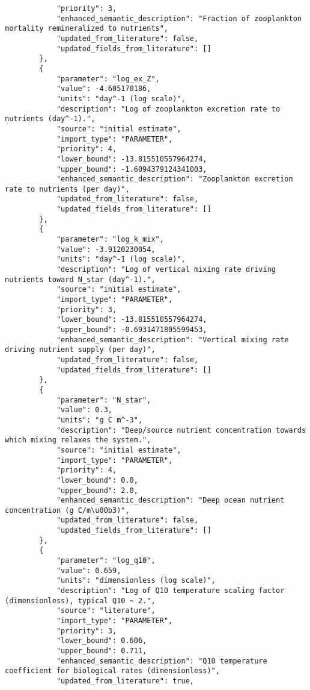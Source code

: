 \begin{lstlisting}
            "priority": 3,
            "enhanced_semantic_description": "Fraction of zooplankton mortality remineralized to nutrients",
            "updated_from_literature": false,
            "updated_fields_from_literature": []
        },
        {
            "parameter": "log_ex_Z",
            "value": -4.605170186,
            "units": "day^-1 (log scale)",
            "description": "Log of zooplankton excretion rate to nutrients (day^-1).",
            "source": "initial estimate",
            "import_type": "PARAMETER",
            "priority": 4,
            "lower_bound": -13.815510557964274,
            "upper_bound": -1.6094379124341003,
            "enhanced_semantic_description": "Zooplankton excretion rate to nutrients (per day)",
            "updated_from_literature": false,
            "updated_fields_from_literature": []
        },
        {
            "parameter": "log_k_mix",
            "value": -3.9120230054,
            "units": "day^-1 (log scale)",
            "description": "Log of vertical mixing rate driving nutrients toward N_star (day^-1).",
            "source": "initial estimate",
            "import_type": "PARAMETER",
            "priority": 3,
            "lower_bound": -13.815510557964274,
            "upper_bound": -0.6931471805599453,
            "enhanced_semantic_description": "Vertical mixing rate driving nutrient supply (per day)",
            "updated_from_literature": false,
            "updated_fields_from_literature": []
        },
        {
            "parameter": "N_star",
            "value": 0.3,
            "units": "g C m^-3",
            "description": "Deep/source nutrient concentration towards which mixing relaxes the system.",
            "source": "initial estimate",
            "import_type": "PARAMETER",
            "priority": 4,
            "lower_bound": 0.0,
            "upper_bound": 2.0,
            "enhanced_semantic_description": "Deep ocean nutrient concentration (g C/m\u00b3)",
            "updated_from_literature": false,
            "updated_fields_from_literature": []
        },
        {
            "parameter": "log_q10",
            "value": 0.659,
            "units": "dimensionless (log scale)",
            "description": "Log of Q10 temperature scaling factor (dimensionless), typical Q10 ~ 2.",
            "source": "literature",
            "import_type": "PARAMETER",
            "priority": 3,
            "lower_bound": 0.606,
            "upper_bound": 0.711,
            "enhanced_semantic_description": "Q10 temperature coefficient for biological rates (dimensionless)",
            "updated_from_literature": true,

\end{lstlisting}
